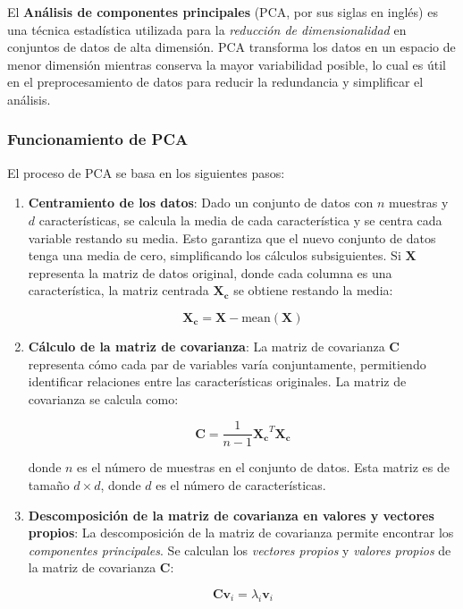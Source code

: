 El \textbf{Análisis de componentes principales} (PCA, por sus siglas en inglés) es una técnica estadística utilizada para la \textit{reducción de dimensionalidad} en conjuntos de datos de alta dimensión. PCA transforma los datos en un espacio de menor dimensión mientras conserva la mayor variabilidad posible, lo cual es útil en el preprocesamiento de datos para reducir la redundancia y simplificar el análisis.

\subsubsection{Funcionamiento de PCA}

El proceso de PCA se basa en los siguientes pasos:

\begin{enumerate}
    \item \textbf{Centramiento de los datos}: 
    Dado un conjunto de datos con \(n\) muestras y \(d\) características, se calcula la media de cada característica y se centra cada variable restando su media. Esto garantiza que el nuevo conjunto de datos tenga una media de cero, simplificando los cálculos subsiguientes. Si \(\mathbf{X}\) representa la matriz de datos original, donde cada columna es una característica, la matriz centrada \(\mathbf{X_c}\) se obtiene restando la media:
    
    \[
    \mathbf{X_c} = \mathbf{X} - \text{mean}(\mathbf{X})
    \]

    \item \textbf{Cálculo de la matriz de covarianza}: 
    La matriz de covarianza \(\mathbf{C}\) representa cómo cada par de variables varía conjuntamente, permitiendo identificar relaciones entre las características originales. La matriz de covarianza se calcula como:

    \[
    \mathbf{C} = \frac{1}{n-1} \mathbf{X_c}^T \mathbf{X_c}
    \]

    donde \(n\) es el número de muestras en el conjunto de datos. Esta matriz es de tamaño \(d \times d\), donde \(d\) es el número de características.

    \item \textbf{Descomposición de la matriz de covarianza en valores y vectores propios}: 
    La descomposición de la matriz de covarianza permite encontrar los \textit{componentes principales}. Se calculan los \textit{vectores propios} y \textit{valores propios} de la matriz de covarianza \(\mathbf{C}\):

    \[
    \mathbf{C} \mathbf{v}_i = \lambda_i \mathbf{v}_i
    \]


\end{enumerate}
